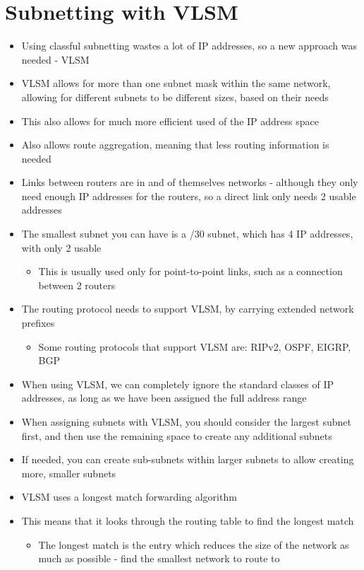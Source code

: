 
\section*{Subnetting with VLSM}

\begin{itemize}
  \item Using classful subnetting wastes a lot of IP addresses, so a new approach was needed - VLSM
  \item VLSM allows for more than one subnet mask within the same network, allowing for different subnets to be different sizes, based on their needs
  \item This also allows for much more efficient used of the IP address space
  \item Also allows route aggregation, meaning that less routing information is needed
  \item Links between routers are in and of themselves networks - although they only need enough IP addresses for the routers, so a direct link only needs 2 usable addresses
  \item The smallest subnet you can have is a /30 subnet, which has 4 IP addresses, with only 2 usable
  \begin{itemize}
    \item This is usually used only for point-to-point links, such as a connection between 2 routers
  \end{itemize}
\end{itemize}

\begin{itemize}
  \item The routing protocol needs to support VLSM, by carrying extended network prefixes
  \begin{itemize}
    \item Some routing protocols that support VLSM are: RIPv2, OSPF, EIGRP, BGP
  \end{itemize}
  \item When using VLSM, we can completely ignore the standard classes of IP addresses, as long as we have been assigned the full address range
  \item When assigning subnets with VLSM, you should consider the largest subnet first, and then use the remaining space to create any additional subnets
  \item If needed, you can create sub-subnets within larger subnets to allow creating more, smaller subnets
  \item VLSM uses a longest match forwarding algorithm
  \item This means that it looks through the routing table to find the longest match
  \begin{itemize}
    \item The longest match is the entry which reduces the size of the network as much as possible - find the smallest network to route to
  \end{itemize}
\end{itemize}


